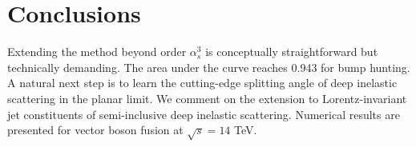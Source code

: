 \section{Conclusions}\label{sec:conclusions}

Extending the method beyond order $\alpha_s^3$ is conceptually
straightforward but technically demanding. The area under the curve
reaches 0.943 for bump hunting. A natural next step is to learn the
cutting-edge splitting angle of deep inelastic scattering in the planar
limit. We comment on the extension to Lorentz-invariant jet constituents
of semi-inclusive deep inelastic scattering. Numerical results are
presented for vector boson fusion at $\sqrt{s} = 14$ TeV.

